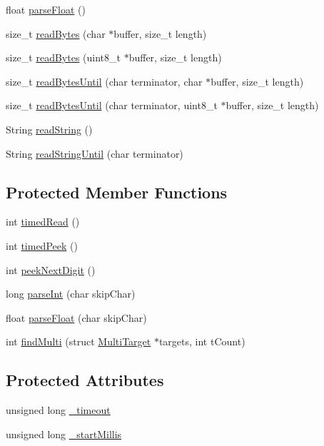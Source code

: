 \begin{DoxyCompactItemize}
float \hyperlink{class_stream_a327a9ae2bfcaf84ddd69477839507ca7}{parse\+Float} ()
\item 
size\+\_\+t \hyperlink{class_stream_ada0b9486ea1fe7b8d4aab8f04f5607ee}{read\+Bytes} (char $\ast$buffer, size\+\_\+t length)
\item 
size\+\_\+t \hyperlink{class_stream_a4ef72b9bae2f35c08ddc4292e5ac1df4}{read\+Bytes} (uint8\+\_\+t $\ast$buffer, size\+\_\+t length)
\item 
size\+\_\+t \hyperlink{class_stream_a9aa68dc2abab64ceafe8d8745b728af2}{read\+Bytes\+Until} (char terminator, char $\ast$buffer, size\+\_\+t length)
\item 
size\+\_\+t \hyperlink{class_stream_a9fcaea3bb67432821ddbde8a13331429}{read\+Bytes\+Until} (char terminator, uint8\+\_\+t $\ast$buffer, size\+\_\+t length)
\item 
String \hyperlink{class_stream_ab1b0d4ef00718d18fe34d35dd1e26c66}{read\+String} ()
\item 
String \hyperlink{class_stream_ac1f2b6e32ae2e321ad98c16482edf96a}{read\+String\+Until} (char terminator)
\end{DoxyCompactItemize}
\subsection*{Protected Member Functions}
\begin{DoxyCompactItemize}
\item 
int \hyperlink{class_stream_a7cc09dd787a79c17281039b4456dc6aa}{timed\+Read} ()
\item 
int \hyperlink{class_stream_a157762e7d29562248c38ecbe6daa2fae}{timed\+Peek} ()
\item 
int \hyperlink{class_stream_a6a68a089460a8e332fad1002d36374a5}{peek\+Next\+Digit} ()
\item 
long \hyperlink{class_stream_aa5269d83a12f784ac9d54e19104d39fe}{parse\+Int} (char skip\+Char)
\item 
float \hyperlink{class_stream_aa66300bfdb6b2eda158d84dbaf5adcb5}{parse\+Float} (char skip\+Char)
\item 
int \hyperlink{class_stream_a34d087eec23d221a8ed4c5279cf9cf4c}{find\+Multi} (struct \hyperlink{struct_stream_1_1_multi_target}{Multi\+Target} $\ast$targets, int t\+Count)
\end{DoxyCompactItemize}
\subsection*{Protected Attributes}
\begin{DoxyCompactItemize}
\item 
unsigned long \hyperlink{class_stream_a24c7e4b09282e8150935ce8da759e176}{\+\_\+timeout}
\item 
unsigned long \hyperlink{class_stream_a30515d765ff208be483b71592aa9da72}{\+\_\+start\+Millis}
\end{DoxyCompactItemize}


